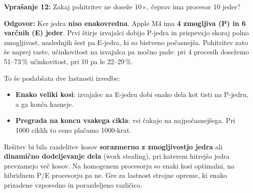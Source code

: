 \documentclass[11pt,a4paper]{article}
\begin{document}
\begin{vprasanje}
\textbf{Vprašanje 12:} Zakaj pohitritev ne dose\v{z}e 10$\times$, \v{c}eprav ima procesor 10 jeder?

\textbf{Odgovor:}
Ker jedra \textbf{niso enakovredna}. Apple M4 ima \textbf{4 zmogljiva (P) in 6 var\v{c}nih (E) jeder}. Prvi \v{s}tirje izvajalci dobijo P-jedra in prispevajo skoraj polno zmogljivost, naslednjih \v{s}est pa E-jedra, ki so bistveno po\v{c}asnej\v{s}a. Pohitritev zato \v{s}e naprej raste, u\v{c}inkovitost na izvajalca pa mo\v{c}no pade: pri 4 procesih dose\v{z}emo 51--73\,\% u\v{c}inkovitost, pri 10 pa le 22--29\,\%.

To \v{s}e poslab\v{s}ata dve lastnosti izvedbe:
\begin{itemize}
    \item \textbf{Enako veliki kosi}: izvajalec na E-jedru dobi enako dela kot tisti na P-jedru, a ga kon\v{c}a kasneje.
    \item \textbf{Pregrada na koncu vsakega cikla}: vsi \v{c}akajo na najpo\v{c}asnej\v{s}ega. Pri 1000 ciklih to ceno pla\v{c}amo 1000-krat.
\end{itemize}

Re\v{s}itev bi bila razdelitev kosov \textbf{sorazmerno z zmogljivostjo jedra} ali \textbf{dinami\v{c}no dodeljevanje dela} (work stealing), pri katerem hitrej\v{s}a jedra prevzamejo ve\v{c} kosov. Na homogenem procesorju so enaki kosi optimalni, na hibridnem P/E procesorju pa ne. Gre za lastnost strojne opreme, ki enako prizadene vzporedno in porazdeljeno razli\v{c}ico.
\end{vprasanje}
\end{document}

